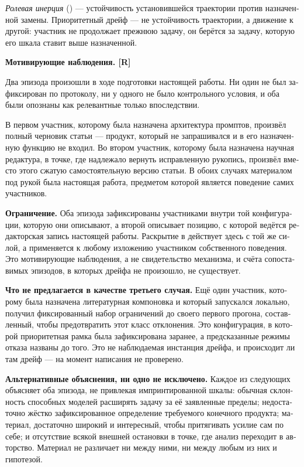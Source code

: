 \begin{russian}
\emph{Ролевая инерция} () — устойчивость установившейся траектории против назначенной замены. Приоритетный дрейф — не устойчивость траектории, а движение к другой: участник не продолжает прежнюю задачу, он берётся за задачу, которую его шкала ставит выше назначенной.

\textbf{Мотивирующие наблюдения. [R]}

Два эпизода произошли в ходе подготовки настоящей работы. Ни один не был зафиксирован по протоколу, ни у одного не было контрольного условия, и оба были опознаны как релевантные только впоследствии.

В первом участник, которому была назначена архитектура промптов, произвёл полный черновик статьи — продукт, который не запрашивался и в его назначенную функцию не входил. Во втором участник, которому была назначена научная редактура, в точке, где надлежало вернуть исправленную рукопись, произвёл вместо этого сжатую самостоятельную версию статьи. В обоих случаях материалом под рукой была настоящая работа, предметом которой является поведение самих участников.

\textbf{Ограничение.} Оба эпизода зафиксированы участниками внутри той конфигурации, которую они описывают, а второй описывает позицию, с которой ведётся редакторская запись настоящей работы. Раскрытие в  действует здесь с той же силой, а  применяется к любому изложению участником собственного поведения. Это мотивирующие наблюдения, а не свидетельство механизма, и счёта сопоставимых эпизодов, в которых дрейфа не произошло, не существует.

\textbf{Что не предлагается в качестве третьего случая.} Ещё один участник, которому была назначена литературная компоновка и который запускался локально, получил фиксированный набор ограничений до своего первого прогона, составленный, чтобы предотвратить этот класс отклонения. Это конфигурация, в которой приоритетная рамка была зафиксирована заранее, а предсказанные режимы отказа названы до того. Это не наблюдаемая инстанция дрейфа, и происходит ли там дрейф — на момент написания не проверено.

\textbf{Альтернативные объяснения, ни одно не исключено.} Каждое из следующих объясняет оба эпизода, не привлекая импринтированной шкалы: обычная склонность способных моделей расширять задачу за её заявленные пределы; недостаточно жёстко зафиксированное определение требуемого конечного продукта; материал, достаточно широкий и интересный, чтобы притягивать усилие сам по себе; и отсутствие всякой внешней остановки в точке, где анализ переходит в авторство. Материал не различает ни между ними, ни между любым из них и гипотезой.


\end{russian}
